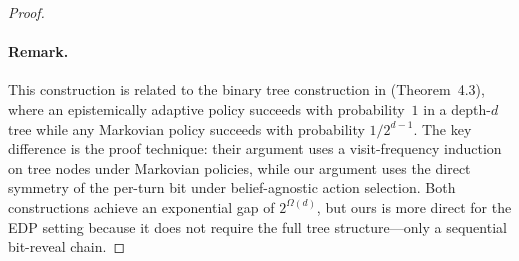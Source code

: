 \documentclass[11pt]{article}
\theoremstyle{plain}
\newtheorem{theorem}{Theorem}[section]
\theoremstyle{definition}
\theoremstyle{remark}
\begin{document}
\begin{proof}
\paragraph{Remark.}
This construction is related to the binary tree construction in 
\citep{zhang2025markovianreflectiveexplorationbayesadaptive} (Theorem~4.3), 
where an epistemically adaptive policy succeeds with probability~$1$ in a 
depth-$d$ tree while any Markovian policy succeeds with probability 
$1/2^{d-1}$. The key difference is the proof technique: their argument 
uses a visit-frequency induction on tree nodes under Markovian policies, 
while our argument uses the direct symmetry of the per-turn bit under 
belief-agnostic action selection. Both constructions achieve an 
exponential gap of $2^{\Omega(d)}$, but ours is more direct for 
the EDP setting because it does not require the full tree structure—only a sequential bit-reveal chain.
\end{proof}


\end{document}
